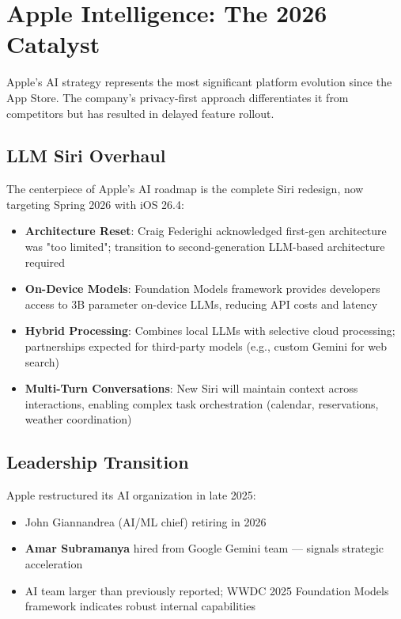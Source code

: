 \documentclass[11pt,a4paper]{article}
\begin{document}
\section{Apple Intelligence: The 2026 Catalyst}

Apple's AI strategy represents the most significant platform evolution since the App Store. The company's privacy-first approach differentiates it from competitors but has resulted in delayed feature rollout.

\subsection{LLM Siri Overhaul}

The centerpiece of Apple's AI roadmap is the complete Siri redesign, now targeting Spring 2026 with iOS 26.4:

\begin{itemize}
    \item \textbf{Architecture Reset}: Craig Federighi acknowledged first-gen architecture was "too limited"; transition to second-generation LLM-based architecture required
    \item \textbf{On-Device Models}: Foundation Models framework provides developers access to 3B parameter on-device LLMs, reducing API costs and latency
    \item \textbf{Hybrid Processing}: Combines local LLMs with selective cloud processing; partnerships expected for third-party models (e.g., custom Gemini for web search)
    \item \textbf{Multi-Turn Conversations}: New Siri will maintain context across interactions, enabling complex task orchestration (calendar, reservations, weather coordination)
\end{itemize}

\subsection{Leadership Transition}

Apple restructured its AI organization in late 2025:

\begin{itemize}
    \item John Giannandrea (AI/ML chief) retiring in 2026
    \item \textbf{Amar Subramanya} hired from Google Gemini team --- signals strategic acceleration
    \item AI team larger than previously reported; WWDC 2025 Foundation Models framework indicates robust internal capabilities
\end{itemize}
\end{document}
